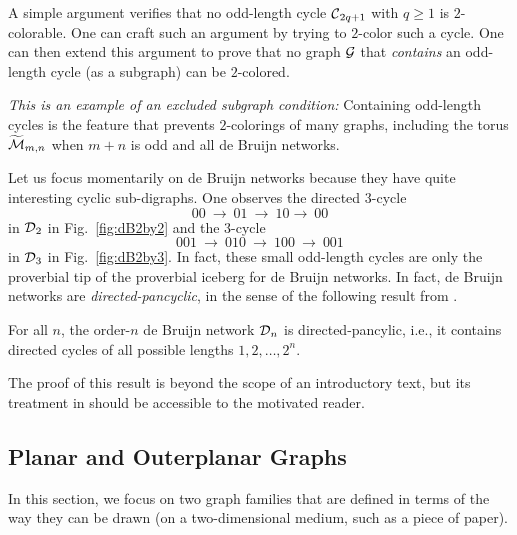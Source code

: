 A simple argument verifies that no odd-length cycle $\mbox{$\cal C$}_{2q+1}$ with $q \geq 1$ is $2$-colorable.  One can craft such an argument by trying to $2$-color such a cycle.  One can then extend this argument to prove that no graph $\mbox{$\cal G$}$ that {\em contains} an odd-length cycle (as a subgraph) can be $2$-colored.

{\em This is an example of an {\em excluded subgraph} condition:}  Containing odd-length cycles is the feature that prevents $2$-colorings of many graphs, including the torus $\widetilde{\mbox{$\cal M$}}_{m,n}$ when $m+n$ is odd and all de Bruijn networks.


\smallskip

Let us focus momentarily on de Bruijn networks because they have quite interesting cyclic sub-digraphs.  One observes the directed $3$-cycle
\[ 00 \ \rightarrow \ 01 \ \rightarrow \ 10  \rightarrow \ 00 \]
in $\mbox{$\cal D$}_2$ in Fig.~\ref{fig:dB2by2} and the $3$-cycle
\[ 001 \ \rightarrow \ 010 \ \rightarrow \ 100 \ \rightarrow \ 001 \]
in $\mbox{$\cal D$}_3$ in Fig.~\ref{fig:dB2by3}.  In fact, these small odd-length cycles are only the proverbial tip of the proverbial iceberg for de Bruijn networks.  In fact, de Bruijn networks are {\it directed-pancyclic}, in the sense of the following result from \cite{Yoeli62}.

  

\begin{prop}
For all $n$, the order-$n$ de Bruijn network $\mbox{$\cal D$}_n$ is directed-pancylic, i.e., it contains directed cycles of all possible lengths $1, 2, \ldots, 2^n$.
\end{prop}

The proof of this result is beyond the scope of an introductory text, but its treatment in \cite{Yoeli62} should be accessible to the motivated reader.

\subsection{Planar and Outerplanar Graphs}
\label{sec:planar+outerplanar-color}
 
 

In this section, we focus on two graph families that are defined in terms of the way they can be drawn (on a two-dimensional medium, such as a piece of paper).

